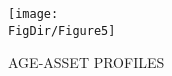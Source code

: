 \hypertarget{AgeAssetProfiles}{}
\begin{figure}[tbp]
  \centerline{\texttt{[image: \\FigDir/Figure5]}}
  \caption{AGE-ASSET PROFILES}
  \label{fig:AgeAssetProfiles}
\end{figure}
